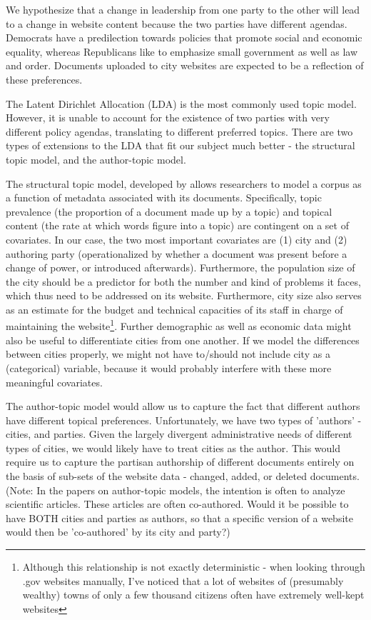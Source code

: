 \documentclass[11pt]{article}
\begin{document}
We hypothesize that a change in leadership from one party to the other will lead to a change in website content because the two parties have different agendas. Democrats have a predilection towards policies that promote social and economic equality, whereas Republicans like to emphasize small government as well as law and order. Documents uploaded to city websites are expected to be a reflection of these preferences.

The Latent Dirichlet Allocation (LDA) \citep{Blei2003} is the most commonly used topic model. However, it is unable to account for the existence of two parties with very different policy agendas, translating to different preferred topics. There are two types of extensions to the LDA that fit our subject much better - the structural topic model, and the author-topic model.

The structural topic model, developed by \cite{Roberts2016a} allows researchers to model a corpus as a function of metadata associated with its documents. Specifically, topic prevalence (the proportion of a document made up by a topic) and topical content (the rate at which words figure into a topic) are contingent on a set of covariates. In our case, the two most important covariates are (1) city and (2) authoring party (operationalized by whether a document was present before a change of power, or introduced afterwards). Furthermore, the population size of the city should be a predictor for both the number and kind of problems it faces, which thus need to be addressed on its website. Furthermore, city size also serves as an estimate for the budget and technical capacities of its staff in charge of maintaining the website\footnote{Although this relationship is not exactly deterministic - when looking through .gov websites manually, I've noticed that a lot of websites of (presumably wealthy)  towns of only a few thousand citizens often have extremely well-kept websites}.  Further demographic as well as economic data might also be useful to differentiate cities from one another. If we model the differences between cities properly, we might not have to/should not include city as a (categorical) variable, because it would probably interfere with these more meaningful covariates.

The author-topic model \citep{Rosen-Zvi2004} would allow us to capture the fact that different authors have different topical preferences. Unfortunately, we have two types of 'authors' - cities, and parties. Given the largely divergent administrative needs of different types of cities, we would likely have to treat cities as the author. This would require us to capture the partisan authorship of different documents entirely on the basis of sub-sets of the website data - changed, added, or deleted documents. (Note: In the papers on author-topic models, the intention is often to analyze scientific articles. These articles are often co-authored. Would it be possible to have BOTH cities and parties as authors, so that a specific version of a website would then be 'co-authored' by its city and party?)
\end{document}
